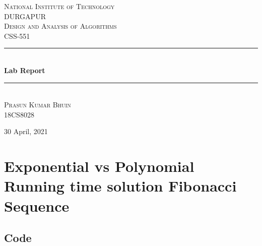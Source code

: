 \documentclass[11pt]{article}
\begin{document}
\begin{titlepage} 

	\newcommand{\HRule}{\rule{\linewidth}{0.5mm}} 
	
	\center 
	
	\textsc{\huge National Institute of Technology}\\[0.5cm] 
	\textsc{\LARGE DURGAPUR}\\[2.5cm]
	
	\textsc{\Large Design and Analysis of Algorithms }\\[0.5cm] 
	
	\textsc{\large CSS-551}\\[1.5cm] %
	
	\HRule\\[0.4cm]
	
	{\huge\bfseries Lab Report }\\[0.1cm] %
	
	\HRule\\[1.5cm]

	
	{\LARGE \textsc{Prasun Kumar Bhuin}}\\[0.3cm] %
    {\large 18CS8028}\\[0.3cm]
	
	\vfill\vfill\vfill %
	
	{\large 30 April, 2021} %

	
\end{titlepage}
\tableofcontents

\newpage


\section{Exponential vs Polynomial Running time solution Fibonacci Sequence}
	\subsection{Code}
		
\end{document}
